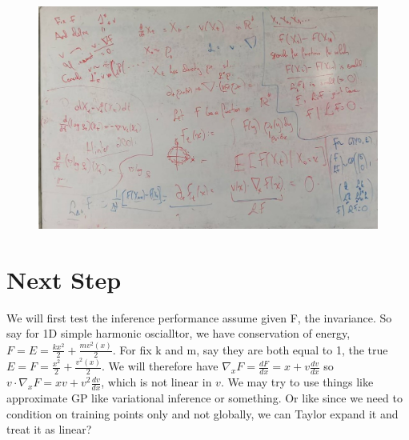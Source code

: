 \documentclass{article}
\begin{document}
\begin{figure}[H]
  \includegraphics[width=\linewidth]{332800.jpg}
  \centering
\end{figure}

\section*{Next Step}
We will first test the inference performance assume given F, the invariance.
So say for 1D simple harmonic oscialltor, we have conservation of energy, $F = E = \frac{kx^2}{2}+\frac{mv^2(x)}{2}.$
For fix k and m, say they are both equal to 1, the true $E=F=\frac{x^2}{2}+\frac{v^2(x)}{2}$. 
We will therefore have $\nabla_xF= \frac{dF}{dx} = x+v\frac{dv}{dx}$ so $v\cdot\nabla_xF=xv+v^2\frac{dv}{dx}$, which is not linear in $v$.
We may try to use things like approximate GP like variational inference or something.
Or like since we need to condition on training points only and not globally, we can Taylor expand it and treat it as linear?
\end{document}

